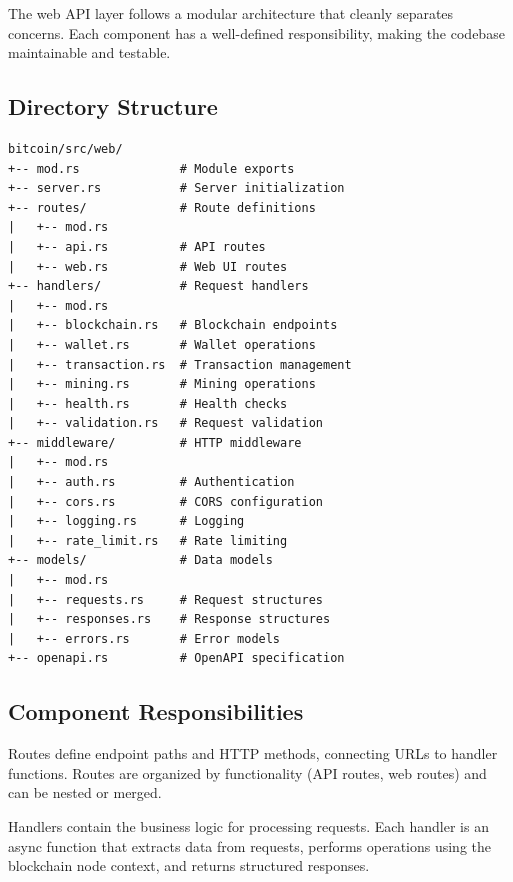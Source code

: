 The web API layer follows a modular architecture that cleanly separates concerns. Each component has a well-defined responsibility, making the codebase maintainable and testable.

\subsection{Directory Structure}

\begin{verbatim}
bitcoin/src/web/
+-- mod.rs              # Module exports
+-- server.rs           # Server initialization
+-- routes/             # Route definitions
|   +-- mod.rs
|   +-- api.rs          # API routes
|   +-- web.rs          # Web UI routes
+-- handlers/           # Request handlers
|   +-- mod.rs
|   +-- blockchain.rs   # Blockchain endpoints
|   +-- wallet.rs       # Wallet operations
|   +-- transaction.rs  # Transaction management
|   +-- mining.rs       # Mining operations
|   +-- health.rs       # Health checks
|   +-- validation.rs   # Request validation
+-- middleware/         # HTTP middleware
|   +-- mod.rs
|   +-- auth.rs         # Authentication
|   +-- cors.rs         # CORS configuration
|   +-- logging.rs      # Logging
|   +-- rate_limit.rs   # Rate limiting
+-- models/             # Data models
|   +-- mod.rs
|   +-- requests.rs     # Request structures
|   +-- responses.rs    # Response structures
|   +-- errors.rs       # Error models
+-- openapi.rs          # OpenAPI specification
\end{verbatim}

\subsection{Component Responsibilities}

\begin{infobox}[Routes]
Routes define endpoint paths and HTTP methods, connecting URLs to handler functions. Routes are organized by functionality (API routes, web routes) and can be nested or merged.
\end{infobox}

\begin{infobox}[Handlers]
Handlers contain the business logic for processing requests. Each handler is an async function that extracts data from requests, performs operations using the blockchain node context, and returns structured responses.
\end{infobox}

